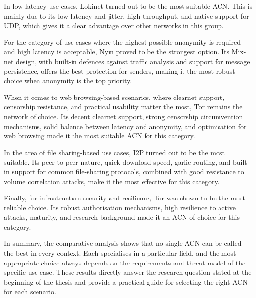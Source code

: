 In low-latency use cases, Lokinet turned out to be the most suitable ACN. This is mainly due to its low latency and jitter, high throughput, and native support for UDP, which gives it a clear advantage over other networks in this group. 

For the category of use cases where the highest possible anonymity is required and high latency is acceptable, Nym proved to be the strongest option. Its Mix-net design, with built-in defences against traffic analysis and support for message persistence, offers the best protection for senders, making it the most robust choice when anonymity is the top priority.

When it comes to web browsing-based scenarios, where clearnet support, censorship resistance, and practical usability matter the most, Tor remains the network of choice. Its decent clearnet support, strong censorship circumvention mechanisms, solid balance between latency and anonymity, and optimisation for web browsing made it the most suitable ACN for this category.

In the area of file sharing-based use cases, I2P turned out to be the most suitable. Its peer-to-peer nature, quick download speed, garlic routing, and built-in support for common file-sharing protocols, combined with good resistance to volume correlation attacks, make it the most effective for this category.

Finally, for infrastructure security and resilience, Tor was shown to be the most reliable choice. Its robust authorisation mechanisms, high resilience to active attacks, maturity, and research background made it an ACN of choice for this category.

In summary, the comparative analysis shows that no single ACN can be called the best in every context. Each specialises in a particular field, and the most appropriate choice always depends on the requirements and threat model of the specific use case. These results directly answer the research question stated at the beginning of the thesis and provide a practical guide for selecting the right ACN for each scenario.
